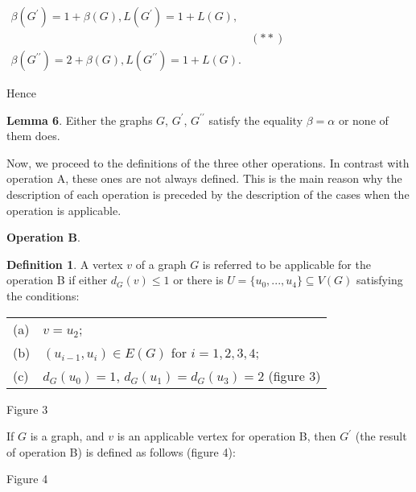 \documentclass{article}
\begin{document}
\begin{center}
$\begin{array}{cc}
\beta (G^{\prime })=1+\beta (G),L(G^{\prime })=1+L(G), &  \\ 
& (\ast \ast ) \\ 
\beta (G^{\prime \prime })=2+\beta (G),L(G^{\prime \prime })=1+L(G). & 
\end{array}$
\end{center}

Hence

\textbf{Lemma 6}. Either the graphs $G$, $G^{\prime }$, $G^{\prime \prime }$
satisfy the equality $\beta =\alpha $ or none of them does.\bigskip

Now, we proceed to the definitions of the three other operations. In
contrast with operation A, these ones are not always defined. This is the
main reason why the description of each operation is preceded by the
description of the cases when the operation is applicable.

\bigskip

\textbf{Operation B}.

\textbf{Definition 1}. A vertex $v$ of a graph $G$ is referred to be
applicable for the operation B if either $d_{G}(v)\leq 1$ or there is $U=\{u_{0},...,u_{4}\}\subseteq V(G)$ satisfying the conditions:

\begin{tabular}{ll}
(a) & $v=u_{2}$; \\ 
(b) & $(u_{i-1},u_{i})\in E(G)$ for $i=1,2,3,4$; \\ 
(c) & $d_{G}(u_{0})=1$, $d_{G}(u_{1})=d_{G}(u_{3})=2$ (figure 3)\end{tabular}

\begin{center}

Figure 3\bigskip
\end{center}

If $G$ is a graph, and $v$ is an applicable vertex for operation B, then $G^{\prime }$ (the result of operation B) is defined as follows (figure 4):

\begin{center}

\bigskip Figure 4
\end{center}
\end{document}
